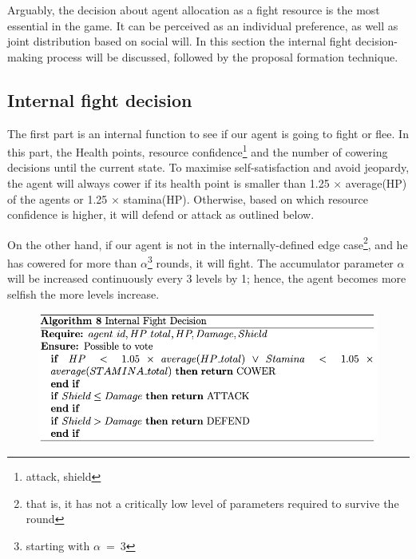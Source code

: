 
Arguably, the decision about agent allocation as a fight resource is the most essential in the game. It can be perceived as an individual preference, as well as joint distribution based on social will. In this section the internal fight decision-making process will be discussed, followed by the proposal formation technique.


    \subsection{Internal fight decision}

        The first part is an internal function to see if our agent is going to fight or flee. In this part, the Health points, resource confidence\footnote{attack, shield} and the number of cowering decisions until the current state.
        To maximise self-satisfaction and avoid jeopardy, the agent will always cower if its health point is smaller  than  1.25 $\times$ average(HP) of the agents or 1.25 $\times$ stamina(HP). Otherwise, based on which resource confidence is higher, it will defend or attack as outlined below.

        On the other hand, if our agent is not in the internally-defined edge case\footnote{that is, it has not a critically low level of parameters required to survive the round}, and he has cowered for more than $\alpha$\footnote{starting with $\alpha~=~3$} rounds, it will fight. The accumulator parameter $\alpha$ will be increased continuously every 3 levels by 1; hence, the agent becomes more selfish the more levels increase.


\begin{figure}[htb]
    \centering
    \includegraphics[scale=0.7]{006_team_3_agent_design/FIGS/Algo8.png}
    \label{fig:algo8}
\end{figure}

